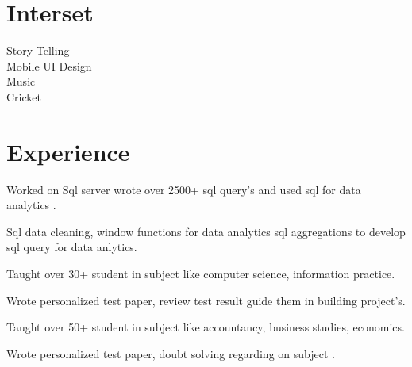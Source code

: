 \documentclass[]{deedy-resume-openfont}
\begin{document}
\begin{minipage}[t]{0.33\textwidth}

\section{Interset}
Story Telling \\
Mobile UI Design \\
Music \\
Cricket \\
\sectionsep

%
%

\end{minipage} 
\hfill
\begin{minipage}[t]{0.66\textwidth} 


\section{Experience}

\vspace{\topsep} 
\begin{tightemize}
\item Worked on Sql server wrote over 2500+ sql query's and used sql for data analytics .
\item Sql data cleaning, window functions for data analytics sql aggregations to develop sql query for data anlytics.
\end{tightemize}
\sectionsep

\descript{| }
\begin{tightemize}
\item Taught over 30+ student in subject like computer science, information practice.
\item Wrote personalized test paper, review test result guide them in building project's.
\end{tightemize}
\sectionsep

\descript{| }
\begin{tightemize}
\item Taught over 50+ student in subject like accountancy, business studies, economics.
\item Wrote personalized test paper, doubt solving regarding on subject .
\end{tightemize}
\sectionsep


\end{minipage}
\end{document}
